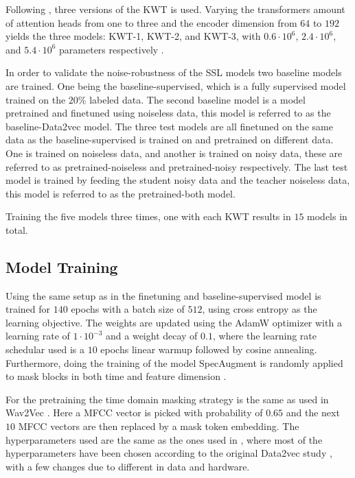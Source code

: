 Following \cite{bovbjerg2023improving}, three versions of the KWT is used. Varying the transformers amount of attention heads from one to three and the encoder dimension from \(64\) to \(192\) yields the three models: KWT-1, KWT-2, and KWT-3, with \(0.6\cdot 10^6\), \(2.4\cdot 10^6\), and \(5.4 \cdot 10^6\) parameters respectively \cite{bovbjerg2023improving}. 

In order to validate the noise-robustness of the SSL models two baseline models are trained. One being the baseline-supervised, which is a fully supervised model trained on the \(20\%\) labeled data. 
The second baseline model is a model pretrained and finetuned using noiseless data, this model is referred to as the baseline-Data2vec model. The three test models are all finetuned on the same data as the baseline-supervised is trained on and pretrained on different data. One is trained on noiseless data, and another is trained on noisy data, these are referred to as pretrained-noiseless and pretrained-noisy respectively. The last test model is trained by feeding the student noisy data and the teacher noiseless data, this model is referred to as the pretrained-both model. 

Training the five models three times, one with each KWT results in \(15\) models in total.


\subsection{Model Training}
Using the same setup as in \cite{bovbjerg2023improving} the finetuning and baseline-supervised model is trained for \(140\) epochs with a batch size of \(512\), using cross entropy as the learning objective. The weights are updated using the AdamW \cite{loshchilov2018fixing} optimizer with a learning rate of \(1 \cdot 10^ {-3}\) and a weight decay of \(0.1\), where the learning rate schedular used is a \(10\) epochs linear warmup followed by cosine annealing. Furthermore, doing the training of the model SpecAugment \cite{park2019specaugment} is randomly applied to mask blocks in both time and feature dimension \cite{bovbjerg2023improving}. 

For the pretraining the time domain masking strategy is the same as used in Wav2Vec \cite{}. Here a MFCC vector is picked with probability of \(0.65\) and the next \(10\) MFCC vectors are then replaced by a mask token embedding. The hyperparameters used are the same as the ones used in \cite{bovbjerg2023improving}, where most of the hyperparameters have been chosen according to the original Data2vec study \cite{baevski2022data2vec}, with a few changes due to different in data and hardware.

